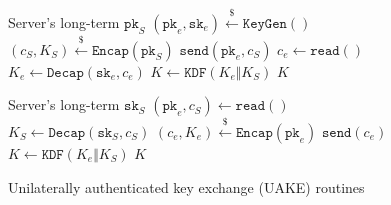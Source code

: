 \documentclass[journal=tches,submission]{iacrtrans}
\newcommand{\keygen}{\texttt{KeyGen}}
\newcommand{\encap}{\texttt{Encap}}
\newcommand{\decap}{\texttt{Decap}}
\newcommand{\pk}{\texttt{pk}}
\newcommand{\sk}{\texttt{sk}}
\newcommand{\leftsample}{\stackrel{\$}{\leftarrow}}
\begin{document}
\begin{figure}[H]
    \centering
    \begin{minipage}[b]{0.49\textwidth}
        \begin{algorithm}[H]
            \caption*{$\texttt{UAKE}_\texttt{C}(\pk_S)$}
            \begin{algorithmic}[1]
                \Require Server's long-term $\pk_S$
                \State $(\pk_e, \sk_e) \leftsample \keygen()$
                \State $(c_S, K_S) \leftsample \encap(\pk_S)$
                \State $\texttt{send}(\pk_e, c_S)$
                \State $c_e \leftarrow \texttt{read}()$
                \State $K_e \leftarrow \decap(\sk_e, c_e)$
                \State $K \leftarrow \texttt{KDF}(K_e \Vert K_S)$
                \State \Return $K$
            \end{algorithmic}
        \end{algorithm}
    \end{minipage}\hfill
    \begin{minipage}[b]{0.49\textwidth}
        \begin{algorithm}[H]
            \caption*{$\texttt{UAKE}_\texttt{S}(\sk_S)$}
            \begin{algorithmic}[1]
                \Require Server's long-term $\sk_S$
                \State $(\pk_e, c_S) \leftarrow \texttt{read}()$
                \State $K_S \leftarrow \decap(\sk_S, c_S)$
                \State $(c_e, K_e) \leftsample \encap(\pk_e)$
                \State $\texttt{send}(c_e)$
                \State $K \leftarrow \texttt{KDF}(K_e \Vert K_S)$
                \State \Return $K$
            \end{algorithmic}
        \end{algorithm}
    \end{minipage}

    \caption{Unilaterally authenticated key exchange (UAKE) routines}\label{fig:uake-routines}
\end{figure}
\end{document}
